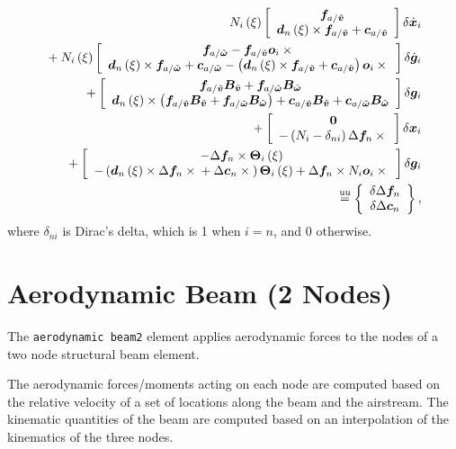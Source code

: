 \begin{align}
	N_i\plbr{\xi} \sqbr{\matr{c}{
		\T{f}_{a/\tilde{\T{v}}} \\
		\T{d}_n\plbr{\xi} \times \T{f}_{a/\tilde{\T{v}}}
		+ \T{c}_{a/\tilde{\T{v}}}
	}} \delta\dot{\T{x}}_i
	\nonumber \\
%
	\mbox{}
	+ N_i\plbr{\xi} \sqbr{\matr{c}{
		\T{f}_{a/\tilde{\T{\omega}}}
		- \T{f}_{a/\tilde{\T{v}}} \T{o}_i \times{} \\
		\T{d}_n\plbr{\xi} \times \T{f}_{a/\tilde{\T{\omega}}}
		+ \T{c}_{a/\tilde{\T{\omega}}}
		- \plbr{
			\T{d}_n\plbr{\xi} \times \T{f}_{a/\tilde{\T{v}}}
			+ \T{c}_{a/\tilde{\T{v}}}
		} \T{o}_i \times{}
	}} \delta\dot{\T{g}}_i
	\nonumber \\
%
	\mbox{}
	+ \sqbr{\matr{c}{
		\T{f}_{a/\tilde{\T{v}}} \TT{B}_{\tilde{\T{v}}}
			+ \T{f}_{a/\tilde{\T{\omega}}} \TT{B}_{\tilde{\T{\omega}}} \\
		\T{d}_n\plbr{\xi} \times \plbr{
			\T{f}_{a/\tilde{\T{v}}} \TT{B}_{\tilde{\T{v}}}
				+ \T{f}_{a/\tilde{\T{\omega}}} \TT{B}_{\tilde{\T{\omega}}}
		}
		+ \T{c}_{a/\tilde{\T{v}}} \TT{B}_{\tilde{\T{v}}}
			+ \T{c}_{a/\tilde{\T{\omega}}} \TT{B}_{\tilde{\T{\omega}}}
	}} \delta\T{g}_i
	\nonumber \\
%
	\mbox{}
	+ \sqbr{\matr{c}{
		\TT{0} \\
		- \plbr{
			N_i - \delta_{ni}
		} \Delta\T{f}_n \times{}
	}} \delta\T{x}_i
	\nonumber \\
%
	\mbox{}
	+ \sqbr{\matr{c}{
		- \Delta\T{f}_n \times \TT{\Theta}_i\plbr{\xi} \\
		- \plbr{
			\T{d}_n\plbr{\xi} \times \Delta\T{f}_n \times{}
			+ \Delta\T{c}_n \times{}
		} \TT{\Theta}_i\plbr{\xi}
		+ \Delta\T{f}_n \times N_i \T{o}_i \times{}
	}} \delta\T{g}_i
	\nonumber \\
%
	\equu
	\cubr{\cvvect{
		\delta\Delta\T{f}_n \\
		\delta\Delta\T{c}_n
	}}
	,
\end{align}
where $\delta_{ni}$ is Dirac's delta, which is 1 when $i=n$, and 0 otherwise.




\section{Aerodynamic Beam (2 Nodes)}
The \texttt{aerodynamic beam2} element applies aerodynamic forces
to the nodes of a two node structural beam element. 

The aerodynamic forces/moments acting on each node 
are computed based on the relative velocity of a set of locations
along the beam and the airstream.
The kinematic quantities of the beam are computed based
on an interpolation of the kinematics of the three nodes.

